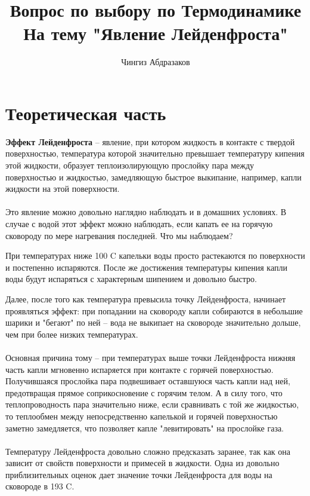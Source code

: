 \documentclass[14 pt]{extreport}
\author{Чингиз Абдразаков}
\title{Вопрос по выбору по Термодинамике\\На тему "Явление Лейденфроста"}
\date{}
\begin{document}
	\maketitle
	
	\newpage
	\section*{Теоретическая часть}
	
	\textbf{Эффект Лейденфроста} -- явление, при котором жидкость в контакте с твердой поверхностью, температура которой значительно превышает температуру кипения этой жидкости, образует теплоизолирующую прослойку пара между поверхностью и жидкостью, замедляющую быстрое выкипание, например, капли жидкости на этой поверхности. \\\\
	
	Это явление можно довольно наглядно наблюдать и в домашних условиях. В случае с водой этот эффект можно наблюдать, если капать ее на горячую сковороду по мере нагревания последней. Что мы наблюдаем? 
	
	При температурах ниже 100 \textdegree C капельки воды просто растекаются по поверхности и постепенно испаряются. После же достижения температуры кипения капли воды будут испаряться с характерным шипением и довольно быстро. 
	
	Далее, после того как температура превысила точку Лейденфроста, начинает проявляться эффект: при попадании на сковороду капли собираются в небольшие шарики и "бегают" по ней -- вода не выкипает на сковороде значительно дольше, чем при более низких температурах. \\\\
	
	Основная причина тому -- при температурах выше точки Лейденфроста нижняя часть капли мгновенно испаряется при контакте с горячей поверхностью. Получившаяся прослойка пара подвешивает оставшуюся часть капли над ней, предотвращая прямое соприкосновение с горячим телом. А в силу того, что теплопроводность пара значительно ниже, если сравнивать с той же жидкостью, то теплообмен между непосредственно капелькой и горячей поверхностью заметно замедляется, что позволяет капле "левитировать" на прослойке газа.\\\\
	
	Температуру Лейденфроста довольно сложно предсказать заранее, так как она зависит от свойств поверхности и примесей в жидкости. Одна из довольно приблизительных оценок дает значение точки Лейденфроста для воды на сковороде в 193 \textdegree C.\\\\
	
\end{document}
